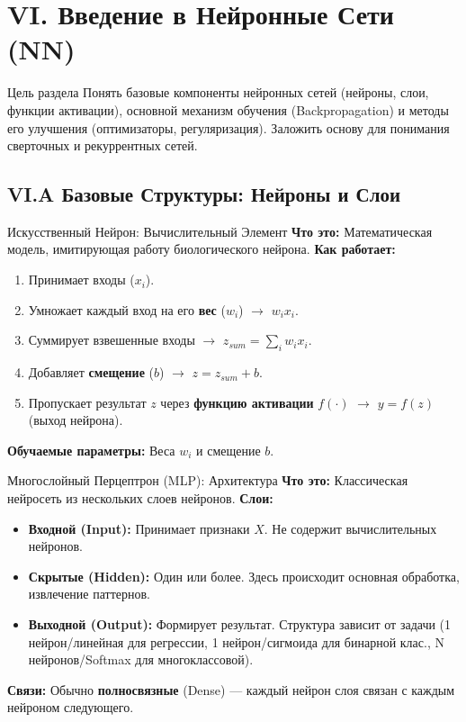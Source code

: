 
\section{VI. Введение в Нейронные Сети (NN)}

\begin{textbox}{Цель раздела}
    Понять базовые компоненты нейронных сетей (нейроны, слои, функции активации), основной механизм обучения (Backpropagation) и методы его улучшения (оптимизаторы, регуляризация). Заложить основу для понимания сверточных и рекуррентных сетей.
\end{textbox}

\subsection{VI.A Базовые Структуры: Нейроны и Слои}

\begin{myblock}{Искусственный Нейрон: Вычислительный Элемент}
    \textbf{Что это:} Математическая модель, имитирующая работу биологического нейрона.
    \textbf{Как работает:}
    \begin{enumerate}
        \item Принимает входы ($x_i$).
        \item Умножает каждый вход на его \textbf{вес} ($w_i$) $\rightarrow$ $w_i x_i$.
        \item Суммирует взвешенные входы $\rightarrow$ $z_{sum} = \sum_{i} w_i x_i$.
        \item Добавляет \textbf{смещение} ($b$) $\rightarrow$ $z = z_{sum} + b$.
        \item Пропускает результат $z$ через \textbf{функцию активации} $f(\cdot)$ $\rightarrow$ $y = f(z)$ (выход нейрона).
    \end{enumerate}
    \textbf{Обучаемые параметры:} Веса $w_i$ и смещение $b$.
\end{myblock}

\begin{myblock}{Многослойный Перцептрон (MLP): Архитектура}
    \textbf{Что это:} Классическая нейросеть из нескольких слоев нейронов.
    \textbf{Слои:}
    \begin{itemize}
        \item \textbf{Входной (Input):} Принимает признаки $X$. Не содержит вычислительных нейронов.
        \item \textbf{Скрытые (Hidden):} Один или более. Здесь происходит основная обработка, извлечение паттернов.
        \item \textbf{Выходной (Output):} Формирует результат. Структура зависит от задачи (1 нейрон/линейная для регрессии, 1 нейрон/сигмоида для бинарной клас., N нейронов/Softmax для многоклассовой).
    \end{itemize}
    \textbf{Связи:} Обычно \textbf{полносвязные} (Dense) — каждый нейрон слоя связан с каждым нейроном следующего.
\end{myblock}

